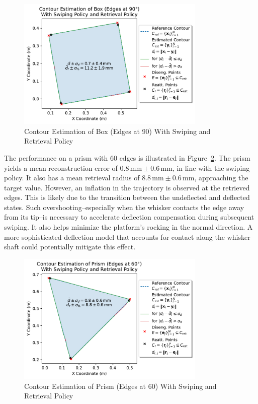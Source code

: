 \begin{figure}[!htb]
    \centering
    \includegraphics[width=0.8\textwidth]{figures/experiments/box-edges-90deg-swiping-retrieval}
    \caption{Contour Estimation of Box (Edges at 90\degree{}) With Swiping and Retrieval Policy}
    \label{fig:experiment-box-edges-90deg-swiping-retrieval}
\end{figure}

The performance on a prism with 60\degree{} edges is illustrated in Figure~\ref{fig:experiment-prism-edges-60deg-swiping-retrieval}.
The prism yields a mean reconstruction error of $0.8\,\text{mm} \pm 0.6\,\text{mm}$, in line with the swiping policy.
It also has a mean retrieval radius of $8.8\,\text{mm} \pm 0.6\,\text{mm}$, approaching the target value.
However, an inflation in the trajectory is observed at the retrieved edges.
This is likely due to the transition between the undeflected and deflected states.
Such overshooting--especially when the whisker contacts the edge away from its tip--is necessary to accelerate deflection compensation during subsequent swiping.
It also helps minimize the platform's rocking in the normal direction.
A more sophisticated deflection model that accounts for contact along the whisker shaft could potentially mitigate this effect.

\begin{figure}[!htb]
    \centering
    \includegraphics[width=0.8\textwidth]{figures/experiments/prism-edges-60deg-swiping-retrieval}
    \caption{Contour Estimation of Prism (Edges at 60\degree{}) With Swiping and Retrieval Policy}
    \label{fig:experiment-prism-edges-60deg-swiping-retrieval}
\end{figure}

